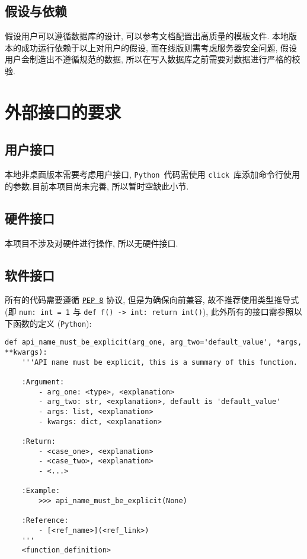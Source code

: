 \documentclass{ctexart}
\newcommand{\python}{\texttt{Python}}
\newcommand{\pepeight}{\texttt{PEP 8}}
\newcommand{\click}{\texttt{click}}
\begin{document}
\subsection{假设与依赖}
假设用户可以遵循数据库的设计, 可以参考文档配置出高质量的模板文件. 本地版本的成功运行依赖于以上对用户的假设, 而在线版则需考虑服务器安全问题, 假设用户会制造出不遵循规范的数据, 所以在写入数据库之前需要对数据进行严格的校验.



\section{外部接口的要求}\label{S:external-interface-requirements}
\subsection{用户接口}
本地非桌面版本需要考虑用户接口, \python\ 代码需使用 \click\ 库添加命令行使用的参数.目前本项目尚未完善, 所以暂时空缺此小节.


\subsection{硬件接口}
本项目不涉及对硬件进行操作, 所以无硬件接口.


\subsection{软件接口}
所有的代码需要遵循 \href{https://www.python.org/dev/peps/pep-0008/}{\pepeight} 协议, 但是为确保向前兼容, 故不推荐使用类型推导式 (即 \texttt{num: int = 1} 与 \texttt{def f() -> int: return int()}), 此外所有的接口需参照以下函数的定义 (\python):
\begin{verbatim}
def api_name_must_be_explicit(arg_one, arg_two='default_value', *args, **kwargs):
    '''API name must be explicit, this is a summary of this function.

    :Argument:
        - arg_one: <type>, <explanation>
        - arg_two: str, <explanation>, default is 'default_value'
        - args: list, <explanation>
        - kwargs: dict, <explanation>

    :Return:
        - <case_one>, <explanation>
        - <case_two>, <explanation>
        - <...>

    :Example:
        >>> api_name_must_be_explicit(None)

    :Reference:
        - [<ref_name>](<ref_link>)
    '''
    <function_definition>
\end{verbatim}
\end{document}
